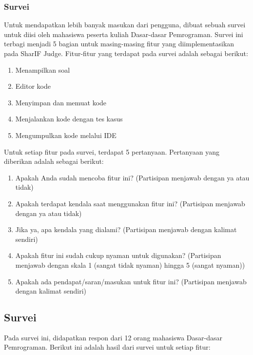 \subsubsection{Survei}
Untuk mendapatkan lebih banyak masukan dari pengguna, dibuat sebuah survei untuk diisi oleh mahasiswa peserta kuliah Dasar-dasar Pemrograman. Survei ini terbagi menjadi 5 bagian untuk masing-masing fitur yang diimplementasikan pada SharIF Judge. Fitur-fitur yang terdapat pada survei adalah sebagai berikut:

\begin{enumerate}
    \item Menampilkan soal
    \item Editor kode
    \item Menyimpan dan memuat kode
    \item Menjalankan kode dengan tes kasus
    \item Mengumpulkan kode melalui IDE
\end{enumerate}

Untuk setiap fitur pada survei, terdapat 5 pertanyaan. Pertanyaan yang diberikan adalah sebagai berikut:

\begin{enumerate}
    \item Apakah Anda sudah mencoba fitur ini? (Partisipan menjawab dengan ya atau tidak)
    \item Apakah terdapat kendala saat menggunakan fitur ini? (Partisipan menjawab dengan ya atau tidak)
    \item Jika ya, apa kendala yang dialami? (Partisipan menjawab dengan kalimat sendiri)
    \item Apakah fitur ini sudah cukup nyaman untuk digunakan? (Partisipan menjawab dengan skala 1 (sangat tidak nyaman) hingga 5 (sangat nyaman))
    \item Apakah ada pendapat/saran/masukan untuk fitur ini? (Partisipan menjawab dengan kalimat sendiri)
\end{enumerate}

\subsection{Survei}
\label{subsec:survei}

Pada survei ini, didapatkan respon dari 12 orang mahasiswa Dasar-dasar Pemrograman. Berikut ini adalah hasil dari survei untuk setiap fitur:

